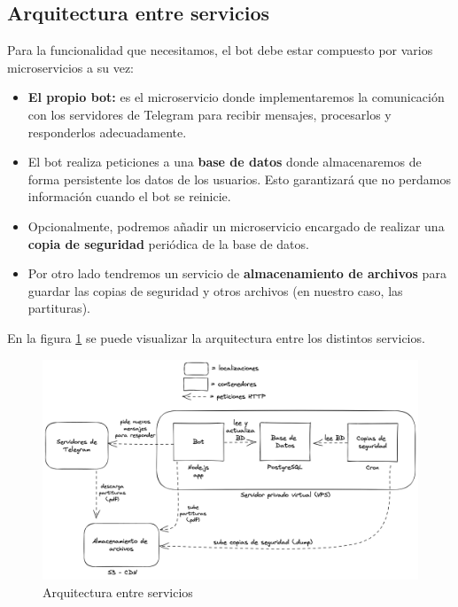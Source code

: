 

\subsection{Arquitectura entre servicios}\label{subsection:arquitecturaServicios}

Para la funcionalidad que necesitamos, el bot debe estar compuesto por varios microservicios a su vez: 

\begin{itemize}
    \item \textbf{El propio bot:} es el microservicio donde implementaremos la comunicación con los servidores de Telegram para recibir mensajes, procesarlos y responderlos adecuadamente.
    \item El bot realiza peticiones a una \textbf{base de datos} donde almacenaremos de forma persistente los datos de los usuarios. Esto garantizará que no perdamos información cuando el bot se reinicie.
    \item Opcionalmente, podremos añadir un microservicio encargado de realizar una \textbf{copia de seguridad} periódica de la base de datos.
    \item Por otro lado tendremos un servicio de \textbf{almacenamiento de archivos} para guardar las copias de seguridad y otros archivos (en nuestro caso, las partituras).
\end{itemize}

En la figura \ref{fig:arquitecturaServicios} se puede visualizar la arquitectura entre los distintos servicios.

\begin{figure}[h]
\centering
\includegraphics[width=\textwidth]{imagenes/disenyo_tecnico/arquitectura_servicios.png}
\caption{Arquitectura entre servicios}
\label{fig:arquitecturaServicios}
\end{figure}

